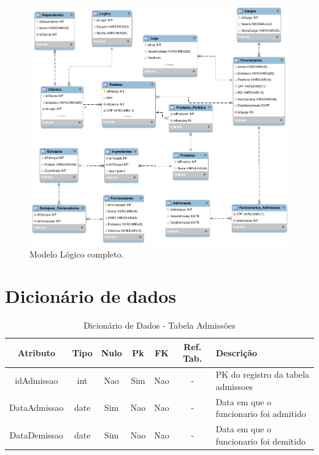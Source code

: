 \documentclass[
	12pt,				%
	openright,			%
	oneside,			%
	a4paper,			%
	chapter=TITLE,		%
	section=TITLE,		%
	english,			%
	brazil				%
	]{abntex2}
\begin{document}
    \begin{figure}[h]
         \centering
         \includegraphics[width=20cm,keepaspectratio, angle=90]{Imgs/ML_00}
         \caption{Modelo Lógico completo.}
         \label{ml_00}
    \end{figure}

    \section{Dicionário de dados}
    
    \begin{table}[htbp]
    \centering
        \caption{Dicionário de Dados - Tabela Admissões}
        \label{tb1_dicionario_dados_admissoes}
        \begin{tabular}{|c|c|c|c|c|c|p{3cm}|}
            \hline 
            \textbf{Atributo} & 
            \textbf{Tipo} & 
            \textbf{Nulo} & 
            \textbf{Pk} & 
            \textbf{FK} & 
            \textbf{Ref. Tab.} & 
            \textbf{Descrição} \\ \hline
            idAdmissao & int & Nao & Sim & Nao & - & PK do registro da tabela admissoes \\ \hline
            DataAdmissao & date & Sim & Nao & Nao & - & Data em que o funcionario foi admitido \\ \hline
            DataDemissao & date & Sim & Nao & Nao & - & Data em que o funcionario foi demitido \\ \hline
        \end{tabular}        
    \end{table}
    
\end{document}
